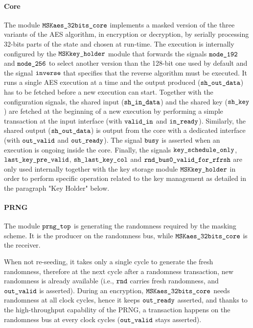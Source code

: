 \documentclass{scrartcl}
\begin{document}
\paragraph{Core}
The module $\texttt{MSKaes\_32bits\_core}$ implements a masked version of the three variants of
the AES algorithm, in encryption or decryption, by serially processing 32-bits
parts of the state and chosen at run-time. The execution is internally
configured by the $\texttt{MSKkey\_holder}$ module that forwards the signals
$\texttt{mode\_192}$ and $\texttt{mode\_256}$ to select another version than the 128-bit
one used by default and the signal $\texttt{inverse}$ that specifies that the
reverse algorithm must be executed. It runs a single AES execution at a time
and the output produced ($\texttt{sh\_out\_data}$) has to be fetched before a new
execution can start. Together with the configuration signals, the shared input ($\texttt{sh\_in\_data}$) and the shared key
($\texttt{sh\_key}$) are fetched at the beginning of a new execution by performing
a simple transaction at the input interface (with $\texttt{valid\_in}$ and
$\texttt{in\_ready}$).  Similarly, the shared output ($\texttt{sh\_out\_data}$) is output
from the core with a dedicated interface (with $\texttt{out\_valid}$ and
$\texttt{out\_ready}$). The signal $\texttt{busy}$ is asserted when an execution is
ongoing inside the core.
Finally, the signals $\texttt{key\_schedule\_only}$, $\texttt{last\_key\_pre\_valid}$, 
$\texttt{sh\_last\_key\_col}$ and $\texttt{rnd\_bus0\_valid\_for\_rfrsh}$ are only used internally together with the key storage module $\texttt{MSKkey\_holder}$ in order to perform specific operation 
related to the key management as detailed in the paragraph "Key Holder" below. 

\paragraph{PRNG}
The module $\texttt{prng\_top}$ is generating the randomness required by the 
masking scheme. It is the producer on the randomness bus, while $\texttt{MSKaes\_32bits\_core}$ is
the receiver.

When not re-seeding, it takes only a single cycle to generate the fresh randomness, therefore
at the next cycle after a randomness transaction, new randomness is already available (i.e.,
$\texttt{rnd}$ carries fresh randomness, and $\texttt{out\_valid}$ is asserted).
During an encryption, $\texttt{MSKaes\_32bits\_core}$ needs randomness at all clock cycles, hence
it keeps $\texttt{out\_ready}$ asserted, and thanks to the high-throughput
capability of the PRNG, a transaction happens on the randomness bus at every
clock cycles ($\texttt{out\_valid}$ stays asserted).
\end{document}
